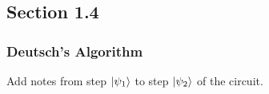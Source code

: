 \subsection{Section 1.4}
\subsubsection{Deutsch's Algorithm}

Add notes from step \(\ket{\psi_1}\) to step \(\ket{\psi_2}\) of the circuit.